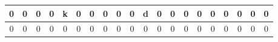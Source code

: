 \documentclass[a4paper]{article}
\begin{document}
{\begin{tabular}{|c|c|c|c|c|c|c|c|c|c|c|c|c|c|c|c|c|c|c|c|}
\cellcolor{black}0 & \cellcolor{black}0 & \cellcolor{black}0 & \cellcolor{black}0 & k & \cellcolor{black}0 & \cellcolor{black}0 & \cellcolor{black}0 & \cellcolor{black}0 & \cellcolor{black}0 & d & \cellcolor{black}0 & \cellcolor{black}0 & \cellcolor{black}0 & \cellcolor{black}0 & \cellcolor{black}0 & \cellcolor{black}0 & \cellcolor{black}0 & \cellcolor{black}0 & \cellcolor{black}0\\ \hline
\cellcolor{black}0 & \cellcolor{black}0 & \cellcolor{black}0 & \cellcolor{black}0 & \cellcolor{black}0 & \cellcolor{black}0 & \cellcolor{black}0 & \cellcolor{black}0 & \cellcolor{black}0 & \cellcolor{black}0 & \cellcolor{black}0 & \cellcolor{black}0 & \cellcolor{black}0 & \cellcolor{black}0 & \cellcolor{black}0 & \cellcolor{black}0 & \cellcolor{black}0 & \cellcolor{black}0 & \cellcolor{black}0 & \cellcolor{black}0\\ \hline
\end{tabular}
}
\end{document}
